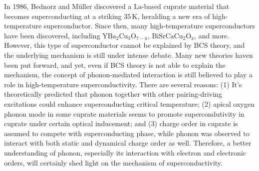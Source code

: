\documentclass[11pt]{article}
\begin{document}
In 1986, Bednorz and Müller discovered a $\mathrm{La}$-based cuprate material that becomes superconducting at a striking $35\,\mathrm{K}$\cite{bednorz_possible_1986}, heralding a new era of high-temperature superconductor. Since then, many  high-temperature superconductors have been discovered, including $\mathrm{YBa_{2}Cu_{3}O_{7-x}}$\cite{wu_superconductivity_1987}, $\mathrm{BiSrCaCu_{2}O_{x}}$\cite{maeda_a_1988}, and more. However, this type of superconductor cannot be explained by BCS theory, and the underlying mechanism is still under intense debate. Many new theories haven been put forward, and yet, even if BCS theory is not able to explain the mechanism, the concept of phonon-mediated interaction is still believed to play a role in high-temperature superconductivity. There are several reasons: (1) It's theoretically predicted that phonon together with other pairing-driving excitations could enhance superconducting critical temperature\cite{braicovich_determining_2020}; (2) apical oxygen phonon mode in some cuprate materials seems to promote supercondutivity in cuprate under certain optical inducement\cite{kaiser_optically_2014}; and (3) charge order in cuprate is assumed to compete with superconducting phase, while phonon was observed to interact with both static and dynamical charge order as well\cite{arpaia_charge_2021,comin_resonant_2016,canosa_resonant_2014, hucker_competing_2014, chang_direct_2012,ghiringhelli_long-range_2012,wang_charge_2021,lin_strongly_2020, huang_quantum_2021,miao_incommensurate_2018,tacon_inelastic_2014,li_multiorbital_2020,braicovich_determining_2020,chaix_dispersive_2017,peng_enhanced_2020}. Therefore, a better understanding of phonon, especially its interaction with electron and electronic orders, will certainly shed light on the mechanism of superconductivity.  
\end{document}
